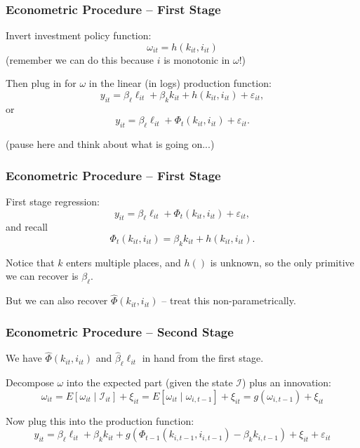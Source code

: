 \documentclass[11pt, aspectratio=169]{beamer}
\newenvironment{wideitemize}{\itemize\addtolength{\itemsep}{10pt}}{\enditemize}
\begin{document}
\begin{frame}[c]\frametitle{Econometric Procedure -- First Stage}
    
\begin{wideitemize}
	\item Invert investment policy function: 
	$$\omega_{it} = h(k_{it},i_{it})$$
	(remember we can do this because $i$ is monotonic in $\omega$!)
	\item Then plug in for $\omega$ in the linear (in logs) production function:
	$$	y_{it} = \beta_{\ell} \ell_{it} + \beta_k k_{it} + h(k_{it},i_{it}) + \varepsilon_{it},$$
	or
	$$	y_{it} = \beta_{\ell} \ell_{it} + \Phi_t(k_{it},i_{it}) + \varepsilon_{it}.$$
	\item \footnotesize(pause here and think about what is going on...)
\end{wideitemize}

\end{frame}


\begin{frame}[c]\frametitle{Econometric Procedure -- First Stage}
    
\begin{wideitemize}
	\item First stage regression:
	$$	y_{it} = \beta_{\ell} \ell_{it} + \Phi_t(k_{it},i_{it}) + \varepsilon_{it},$$
	and recall
	$$\Phi_t(k_{it},i_{it}) = \beta_k k_{it} + h(k_{it},i_{it}).$$
	\item Notice that $k$ enters multiple places, and $h()$ is unknown, so the only primitive we can recover is $\beta_{\ell}$. 
	\item But we can also recover $\hat{\Phi}(k_{it},i_{it})$ -- treat this non-parametrically.
\end{wideitemize}

\end{frame}


\begin{frame}[c]\frametitle{Econometric Procedure -- Second Stage}
    
\begin{wideitemize}
	\item We have $\hat{\Phi}(k_{it},i_{it})$ and $\hat{\beta}_{\ell} \ell_{it}$ in hand from the first stage. 
	\item Decompose $\omega$ into the expected part (given the state $\mathcal{I}$) plus an innovation: 
	$$\omega_{it} = E[\omega_{it}\mid\mathcal{I}_{it}] + \xi_{it} = E[\omega_{it}\mid\omega_{i,t-1}] + \xi_{it} = g(\omega_{i,t-1}) + \xi_{it}$$
	\item Now plug this into the production function:
	$$y_{it} = \beta_{\ell} \ell_{it} + \beta_k k_{it} + g(\Phi_{t-1}(k_{i,t-1},i_{i,t-1})-\beta_k k_{i,t-1}) + \xi_{it} + \varepsilon_{it}$$

\end{wideitemize}


\end{frame}
\end{document}
